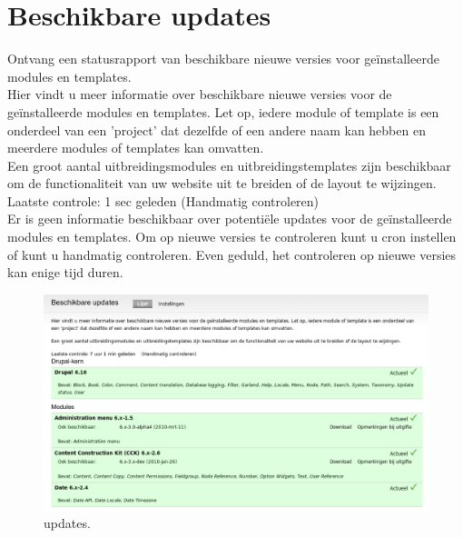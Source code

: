 \section{Beschikbare updates} 
    Ontvang een statusrapport van beschikbare nieuwe versies voor
 ge\"installeerde modules en templates.
\\
Hier vindt u meer informatie over beschikbare nieuwe versies voor de
ge\"installeerde modules en templates. Let op, iedere module of template is een
onderdeel van een 'project' dat dezelfde of een andere naam kan hebben en meerdere modules of templates kan omvatten.\\
Een groot aantal uitbreidingsmodules en uitbreidingstemplates zijn beschikbaar om de functionaliteit van 
uw website uit te breiden of de layout te wijzingen.\\
Laatste controle: 1 sec geleden (Handmatig controleren)\\
Er is geen informatie beschikbaar over potenti\"ele updates voor de
ge\"installeerde modules en templates. Om op nieuwe versies te controleren
kunt u cron instellen of kunt u handmatig controleren. Even geduld, het controleren op nieuwe versies kan enige tijd duren.
\begin{figure}[!h]
    \centering
   \includegraphics[scale=0.4,angle=0]{updates}
   \caption{updates.\label{white}}
 \end{figure}
 

